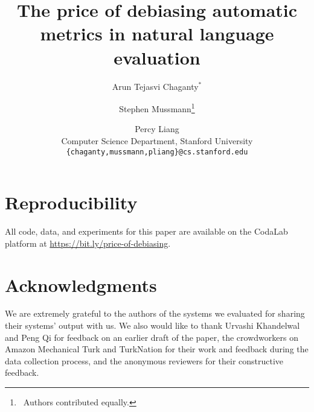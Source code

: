 \documentclass[11pt,a4paper]{article}
\title{The price of debiasing automatic metrics in natural language evaluation}
\author{%
Arun Tejasvi Chaganty$^*$ \and
Stephen Mussmann\thanks{\ Authors contributed equally.}  \and
Percy Liang \\
  Computer Science Department,
  Stanford University \\
  {\tt \{chaganty,mussmann,pliang\}@cs.stanford.edu}
}
\date{}
\theoremstyle{TheoremNum}
\begin{document}
\maketitle











\section*{Reproducibility}
All code, data, and experiments for this paper are available
on the CodaLab platform at \url{https://bit.ly/price-of-debiasing}.

\section*{Acknowledgments}
We are extremely grateful to the authors of the systems we evaluated for sharing their systems' output with us.
We also would like to thank 
  Urvashi Khandelwal and Peng Qi for feedback on an earlier draft of the paper,
  the crowdworkers on Amazon Mechanical Turk and TurkNation for their work and feedback during the data collection process,
  and the anonymous reviewers for their constructive feedback.




\appendix
\clearpage


\end{document}
